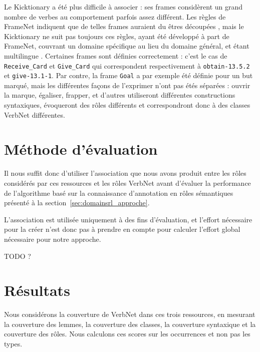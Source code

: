 Le Kicktionary a été plus difficile à associer : ses frames considèrent un
grand nombre de verbes au comportement parfois assez différent. Les règles de
FrameNet indiquent que de telles frames auraient du êtres découpées
\citep{ruppenhofer2006extended}, mais le Kicktionary ne suit pas toujours ces
règles, ayant été développé à part de FrameNet, couvrant un domaine spécifique
au lieu du domaine général, et étant multilingue
\citep{schmidt2006interfacing}. Certaines frames sont définies correctement :
c'est le cas de \texttt{Receive\_Card} et \texttt{Give\_Card} qui correspondent
respectivement à \texttt{obtain-13.5.2} et \texttt{give-13.1-1}. Par contre, la
frame \texttt{Goal} a par exemple été définie pour un but marqué, mais les
différentes façons de l'exprimer n'ont pas étés séparées : ouvrir la marque,
égaliser, frapper, et d'autres utiliseront différentes constructions
syntaxiques, évoqueront des rôles différents et correspondront donc à des
classes VerbNet différentes.

\section{Méthode d'évaluation}

Il nous suffit donc d'utiliser l'association que nous avons produit entre les
rôles considérés par ces ressources et les rôles VerbNet avant d'évaluer la
performance de l'algorithme basé sur la connaissance d'annotation en rôles
sémantiques présenté à la section~\ref{sec:domainsrl_approche}.

L'association est utilisée uniquement à des fins d'évaluation, et l'effort
nécessaire pour la créer n'est donc pas à prendre en compte pour calculer
l'effort global nécessaire pour notre approche.

TODO ?

\section{Résultats}
\label{sec:domainsrlresults}

Nous considérons la couverture de VerbNet dans ces trois ressources, en
mesurant la couverture des lemmes, la couverture des classes, la couverture
syntaxique et la couverture des rôles. Nous calculons ces scores sur les
occurrences et non pas les types.

